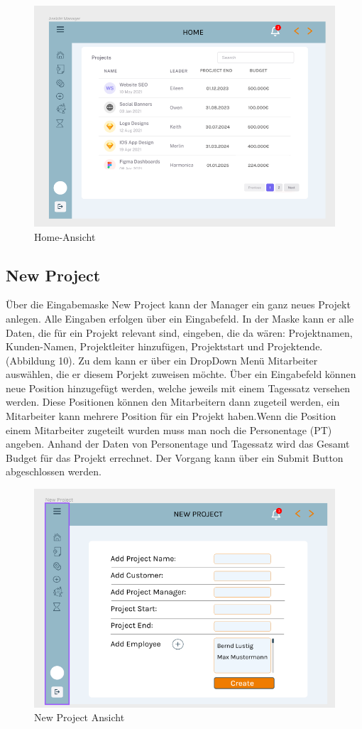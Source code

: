 \documentclass{article}
\begin{document}
\begin{figure}[h]
    \includegraphics[height= 0.5\textwidth,width= \textwidth]{images/Home.png}
    \caption{Home-Ansicht}
    \label{fig:beispiel}
\end{figure}

\newpage
\subsection{New Project}
Über die Eingabemaske New Project kann der Manager ein ganz neues Projekt anlegen. Alle Eingaben erfolgen über ein Eingabefeld. In der Maske kann er alle Daten, die für ein Projekt relevant sind, eingeben, die da wären: Projektnamen, Kunden-Namen, Projektleiter hinzufügen, Projektstart und  Projektende. (Abbildung 10).
Zu dem kann er über ein DropDown Menü Mitarbeiter auswählen, die
er diesem Porjekt zuweisen möchte. Über ein Eingabefeld können neue
Position hinzugefügt werden, welche jeweils mit einem Tagessatz versehen werden.
Diese Positionen können den Mitarbeitern dann zugeteil werden, ein Mitarbeiter
kann mehrere Position für ein Projekt haben.Wenn die Position einem Mitarbeiter
zugeteilt wurden muss man noch die Personentage (PT) angeben. Anhand
der Daten von Personentage und Tagessatz wird das Gesamt Budget für das
Projekt errechnet. Der Vorgang kann über ein Submit Button abgeschlossen werden.

\begin{figure}[h]
    \includegraphics[height= 0.5\textwidth,width= \textwidth]{images/New Project.png}
    \caption{New Project Ansicht}
    \label{fig:beispiel}
\end{figure}
\end{document}
